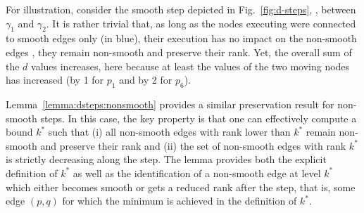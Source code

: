 For illustration, consider the smooth step depicted in
Fig.~\ref{fig:d-steps}, \ie, between $\gamma_1$ and $\gamma_2$.  It is
rather trivial that, as long as the nodes executing were connected to
smooth edges only (in blue), their execution has no impact on the
non-smooth edges \ie, they remain non-smooth and preserve their rank.
Yet, the overall sum of the $d$ values increases, here because at
least the values of the two moving nodes has increased (by 1 for $p_1$
and by 2 for $p_6$).

Lemma~\ref{lemma:dsteps:nonsmooth} provides a similar preservation
result for non-smooth steps.  In this case, the key property is that
one can effectively compute a bound $k^*$ such that (i) all non-smooth
edges with rank lower than $k^*$ remain non-smooth and preserve their
rank and (ii) the set of non-smooth edges with rank $k^*$ is strictly
decreasing along the step.  The lemma provides both the explicit
definition of $k^*$ as well as the identification of a non-smooth edge
at level $k^*$ which either becomes smooth or gets a reduced rank
after the step, that is, some edge $(p,q)$ for which the minimum is
achieved in the definition of $k^*$.

